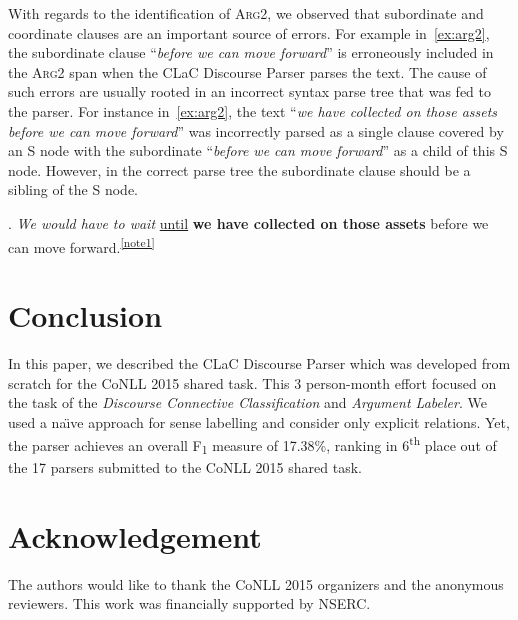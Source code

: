 \documentclass[11pt]{article}
\begin{document}
With regards to the identification of \textsc{Arg2}, we observed that subordinate and coordinate clauses are an important source of errors. For example in~\ref{ex:arg2}, the subordinate clause ``\textit{before we can move forward}'' is erroneously included in the \textsc{Arg2} span when the CLaC Discourse Parser parses the text. The cause of such errors are usually rooted in an incorrect syntax parse tree that was fed to the parser. For instance in~\ref{ex:arg2}, the text ``\textit{we have collected on those assets before we can move forward}'' was incorrectly parsed as a single clause covered by an S node with the subordinate ``\emph{before we can move forward}'' as a child of this S node. However, in the correct parse tree the subordinate clause should be a sibling of the S node.




\ex. \label{ex:arg2} \textit{We would have to wait} \underline{until} \textbf{we have collected on those assets} before we can move forward.\textsuperscript{\ref{note1}}

\section{Conclusion}
\label{sec:conclusion}

In this paper, we described the CLaC Discourse Parser which was developed from scratch for the CoNLL 2015 shared task. This 3 person-month effort focused on the task of the \textit{Discourse Connective Classification} and \textit{Argument Labeler}. We used a na\"\i ve approach for sense labelling and consider only explicit relations. Yet, the parser achieves an overall F\textsubscript{1} measure of 17.38\%, ranking in 6\textsuperscript{th} place out of the 17 parsers submitted to the CoNLL 2015 shared task.

\section{Acknowledgement}

The authors would like to thank the CoNLL 2015 organizers and the anonymous reviewers. This work was financially supported by NSERC. 




\end{document}

